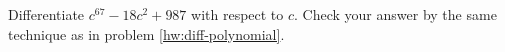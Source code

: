 Differentiate $c^{67}-18c^2+987$ with respect to $c$. Check your answer by the same
technique as in problem \ref{hw:diff-polynomial}.
\answercheck
